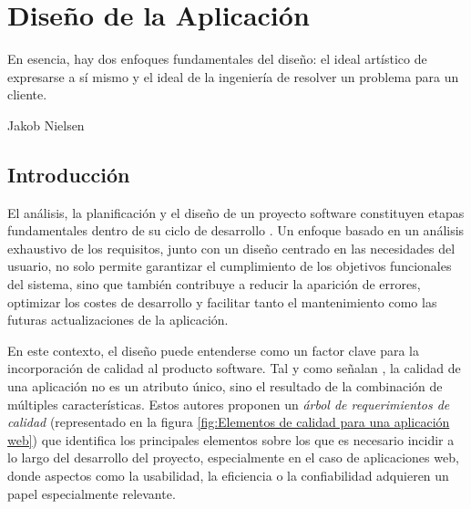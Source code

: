 \chapter{Diseño de la Aplicación}
\label{cap:disenoDeLaAplicacion}

\begin{FraseCelebre}
\begin{Frase}
  En esencia, hay dos enfoques fundamentales del diseño: el ideal artístico de expresarse a sí mismo y el ideal de la ingeniería de resolver un problema para un cliente.
\end{Frase}
\begin{Fuente}
  Jakob Nielsen
\end{Fuente}
\end{FraseCelebre}

\section{Introducción}

El análisis, la planificación y el diseño de un proyecto software constituyen etapas fundamentales dentro de su ciclo de desarrollo \citep{Pressman_2010}. Un enfoque basado en un análisis exhaustivo de los requisitos, junto con un diseño centrado en las necesidades del usuario, no solo permite garantizar el cumplimiento de los objetivos funcionales del sistema, sino que también contribuye a reducir la aparición de errores, optimizar los costes de desarrollo y facilitar tanto el mantenimiento como las futuras actualizaciones de la aplicación.

En este contexto, el diseño puede entenderse como un factor clave para la incorporación de calidad al producto software. Tal y como señalan \cite{Olsina_Lafuente_Rossi_2001}, la calidad de una aplicación no es un atributo único, sino el resultado de la combinación de múltiples características. Estos autores proponen un \textit{árbol de requerimientos de calidad} (representado en la figura \ref{fig:Elementos de calidad para una aplicación web}) que identifica los principales elementos sobre los que es necesario incidir a lo largo del desarrollo del proyecto, especialmente en el caso de aplicaciones web, donde aspectos como la usabilidad, la eficiencia o la confiabilidad adquieren un papel especialmente relevante.

